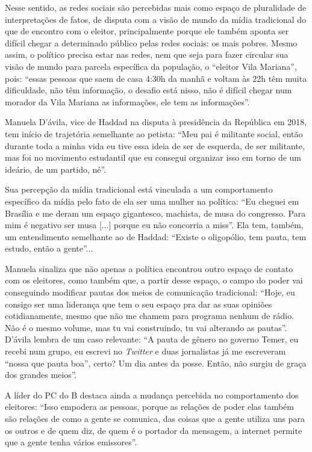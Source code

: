 Nesse sentido, as redes sociais são percebidas mais como espaço de
pluralidade de interpretações de fatos, de disputa com a visão de mundo
da mídia tradicional do que de encontro com o eleitor, principalmente
porque ele também aponta ser difícil chegar a determinado público pelas
redes sociais: os mais pobres. Mesmo assim, o político precisa estar nas
redes, nem que seja para fazer circular sua visão de mundo para parcela
específica da população, o ``eleitor Vila Mariana'', pois: ``essas
pessoas que saem de casa 4:30h da manhã e voltam às 22h têm muita
dificuldade, não têm informação, o desafio está nisso, não é difícil
chegar num morador da Vila Mariana as informações, ele tem as
informações''.

Manuela D'ávila, vice de Haddad na disputa à presidência da República em
2018, tem início de trajetória semelhante ao petista: ``Meu pai é
militante social, então durante toda a minha vida eu tive essa ideia de
ser de esquerda, de ser militante, mas foi no movimento estudantil que
eu consegui organizar isso em torno de um ideário, de um partido, né''.

Sua percepção da mídia tradicional está vinculada a um comportamento
específico da mídia pelo fato de ela ser uma mulher na política: ``Eu
cheguei em Brasília e me deram um espaço gigantesco, machista, de musa
do congresso. Para mim é negativo ser musa {[}...{]} porque eu não
concorria a miss''. Ela tem, também, um entendimento semelhante ao de
Haddad: ``Existe o oligopólio, tem pauta, tem estudo, então a gente''...

Manuela sinaliza que não apenas a política encontrou outro espaço de
contato com os eleitores, como também que, a partir desse espaço, o
campo do poder vai conseguindo modificar pautas dos meios de comunicação
tradicional: ``Hoje, eu consigo ser uma liderança que tem o seu espaço
pra dar as suas opiniões cotidianamente, mesmo que não me chamem para
programa nenhum de rádio. Não é o mesmo volume, mas tu vai construindo,
tu vai alterando as pautas''. D'ávila lembra de um caso relevante: ``A
pauta de gênero no governo Temer, eu recebi num grupo, eu escrevi no
\emph{Twitter} e duas jornalistas já me escreveram ``nossa que pauta
boa'', certo? Um dia antes da posse. Então, não surgiu de graça dos
grandes meios''.

A líder do PC do B destaca ainda a mudança percebida no comportamento
dos eleitores: ``Isso empodera as pessoas, porque as relações de poder
elas também são relações de como a gente se comunica, das coisas que a
gente utiliza uns para os outros e de quem diz, de quem é o portador da
mensagem, a internet permite que a gente tenha vários emissores''.

